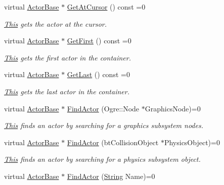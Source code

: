 \begin{DoxyCompactItemize}
virtual \hyperlink{classphys_1_1ActorBase}{ActorBase} $\ast$ \hyperlink{classphys_1_1ActorContainerBase_a2c8fb86a9e188aece105b2a753ccc19a}{GetAtCursor} () const =0
\begin{DoxyCompactList}\small\item\em \hyperlink{structThis}{This} gets the actor at the cursor. \item\end{DoxyCompactList}\item 
virtual \hyperlink{classphys_1_1ActorBase}{ActorBase} $\ast$ \hyperlink{classphys_1_1ActorContainerBase_ae703482d84a9c6726e28a8f26418b161}{GetFirst} () const =0
\begin{DoxyCompactList}\small\item\em \hyperlink{structThis}{This} gets the first actor in the container. \item\end{DoxyCompactList}\item 
virtual \hyperlink{classphys_1_1ActorBase}{ActorBase} $\ast$ \hyperlink{classphys_1_1ActorContainerBase_a8efeffd5ae22085fe01af791b3ea559e}{GetLast} () const =0
\begin{DoxyCompactList}\small\item\em \hyperlink{structThis}{This} gets the last actor in the container. \item\end{DoxyCompactList}\item 
virtual \hyperlink{classphys_1_1ActorBase}{ActorBase} $\ast$ \hyperlink{classphys_1_1ActorContainerBase_a2e4652bf92f24a0ff20bdc4a7173b567}{FindActor} (Ogre::Node $\ast$GraphicsNode)=0
\begin{DoxyCompactList}\small\item\em \hyperlink{structThis}{This} finds an actor by searching for a graphics subsystem nodes. \item\end{DoxyCompactList}\item 
virtual \hyperlink{classphys_1_1ActorBase}{ActorBase} $\ast$ \hyperlink{classphys_1_1ActorContainerBase_a9ba6e38e0f12ada968cfee72fe5144d4}{FindActor} (btCollisionObject $\ast$PhysicsObject)=0
\begin{DoxyCompactList}\small\item\em \hyperlink{structThis}{This} finds an actor by searching for a physics subsystem object. \item\end{DoxyCompactList}\item 
virtual \hyperlink{classphys_1_1ActorBase}{ActorBase} $\ast$ \hyperlink{classphys_1_1ActorContainerBase_a91223cbaebb8e5f11a4f971d7e5b64b6}{FindActor} (\hyperlink{namespacephys_aa03900411993de7fbfec4789bc1d392e}{String} Name)=0

\end{DoxyCompactItemize}
